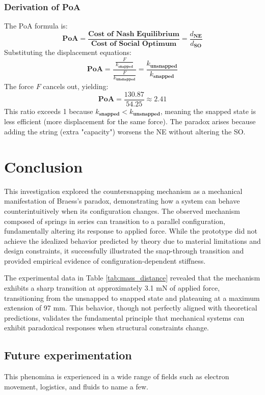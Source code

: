 \documentclass[twocolumn]{article}
\begin{document}
\subsubsection{Derivation of PoA}
The PoA formula is:
\[
\textbf{PoA} = \frac{\textbf{Cost of Nash Equilibrium}}{\textbf{Cost of Social Optimum}} = \frac{d_{\textbf{NE}}}{d_{\textbf{SO}}}
\]
Substituting the displacement equations:
\[
\textbf{PoA} = \frac{\frac{F}{k_{\textbf{snapped}}}}{\frac{F}{k_{\textbf{unsnapped}}}} = \frac{k_{\textbf{unsnapped}}}{k_{\textbf{snapped}}}
\]
The force \(F\) cancels out, yielding:
\[
\textbf{PoA} = \frac{130.87}{54.25} \approx 2.41
\]
This ratio exceeds 1 because \(k_{\textbf{snapped}} < k_{\textbf{unsnapped}}\), meaning the snapped state is less efficient (more displacement for the same force). The paradox arises because adding the string (extra "capacity") worsens the NE without altering the SO.

\section{Conclusion}

This investigation explored the countersnapping mechanism as a mechanical manifestation of Braess's paradox, demonstrating how a system can behave counterintuitively when its configuration changes. The observed mechanism composed of springs in series can transition to a parallel configuration, fundamentally altering its response to applied force. While the prototype did not achieve the idealized behavior predicted by theory due to material limitations and design constraints, it successfully illustrated the snap-through transition and provided empirical evidence of configuration-dependent stiffness.

The experimental data in Table \ref{tab:mass_distance} revealed that the mechanism exhibits a sharp transition at approximately 3.1 mN of applied force, transitioning from the unsnapped to snapped state and plateauing at a maximum extension of 97 mm. This behavior, though not perfectly aligned with theoretical predictions, validates the fundamental principle that mechanical systems can exhibit paradoxical responses when structural constraints change.


\subsection{Future experimentation}
This phenomina is experienced in a wide range of fields such as electron movement, logistics, and fluids to name a few. 
\end{document}
